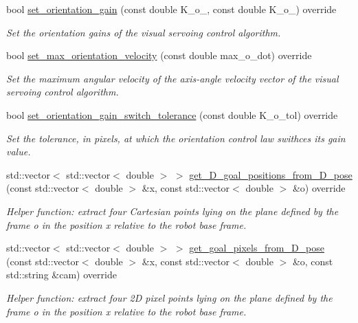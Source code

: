 \begin{DoxyCompactItemize}
bool \hyperlink{classVisualServoingServer_a19bdb0b44a8b556bad599dc03fca5f3f}{set\+\_\+orientation\+\_\+gain} (const double K\+\_\+o\+\_, const double K\+\_\+o\+\_) override
\begin{DoxyCompactList}\small\item\em Set the orientation gains of the visual servoing control algorithm. \end{DoxyCompactList}\item 
bool \hyperlink{classVisualServoingServer_aa3226ef2de2c1743e67788d1bff60679}{set\+\_\+max\+\_\+orientation\+\_\+velocity} (const double max\+\_\+o\+\_\+dot) override
\begin{DoxyCompactList}\small\item\em Set the maximum angular velocity of the axis-\/angle velocity vector of the visual servoing control algorithm. \end{DoxyCompactList}\item 
bool \hyperlink{classVisualServoingServer_a7d8c034f8a133f13ba9b4060ebcaf4bb}{set\+\_\+orientation\+\_\+gain\+\_\+switch\+\_\+tolerance} (const double K\+\_\+o\+\_\+tol) override
\begin{DoxyCompactList}\small\item\em Set the tolerance, in pixels, at which the orientation control law swithces its gain value. \end{DoxyCompactList}\item 
std\+::vector$<$ std\+::vector$<$ double $>$ $>$ \hyperlink{classVisualServoingServer_a542e0a6bf6158563a601740363911474}{get\+\_\+D\+\_\+goal\+\_\+positions\+\_\+from\+\_\+D\+\_\+pose} (const std\+::vector$<$ double $>$ \&x, const std\+::vector$<$ double $>$ \&o) override
\begin{DoxyCompactList}\small\item\em Helper function\+: extract four Cartesian points lying on the plane defined by the frame o in the position x relative to the robot base frame. \end{DoxyCompactList}\item 
std\+::vector$<$ std\+::vector$<$ double $>$ $>$ \hyperlink{classVisualServoingServer_aaa84d7964120ee1056f422dc2d5eb070}{get\+\_\+goal\+\_\+pixels\+\_\+from\+\_\+D\+\_\+pose} (const std\+::vector$<$ double $>$ \&x, const std\+::vector$<$ double $>$ \&o, const std\+::string \&cam) override
\begin{DoxyCompactList}\small\item\em Helper function\+: extract four 2D pixel points lying on the plane defined by the frame o in the position x relative to the robot base frame. \end{DoxyCompactList}\item 

\end{DoxyCompactItemize}

